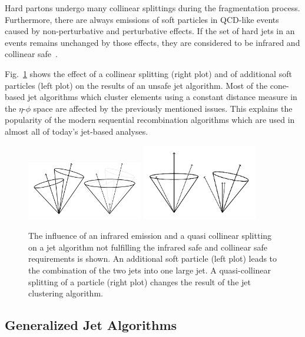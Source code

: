 Hard partons undergo many collinear splittings during the fragmentation process.
Furthermore, there are always emissions of soft particles in QCD-like events
caused by non-perturbative and perturbative effects. If the set of hard jets in an
events remains unchanged by those effects, they are considered to be infrared
and collinear safe~\cite{Salam:2009jx}.

Fig.~\ref{fig:infrared_safety} shows the effect of a collinear splitting (right
plot) and of additional soft particles (left plot) on the results of an unsafe
jet algorithm. Most of the cone-based jet algorithms which cluster elements
using a constant distance measure in the $\eta$-$\phi$ space are affected by the
previously mentioned issues. This explains the popularity of the modern sequential
recombination algorithms which are used in almost all of today's jet-based
analyses.

\begin{figure}[htbp]
    \centering
    \includegraphics[width=0.45\textwidth]{figures/drawings/infrared_safety/jetinfrared.pdf}\hfill
    \includegraphics[width=0.45\textwidth]{figures/drawings/infrared_safety/jetcollinear.pdf}
    \caption[Effect of infrared emissions and collinear splitting on jet
    algorithms]{The influence of an infrared emission and a quasi
        collinear splitting on a jet algorithm not fulfilling the infrared safe
        and collinear safe requirements is shown. An additional soft particle (left plot)
    leads to the combination of the two jets into one large jet. A
quasi-collinear splitting of a particle (right plot) changes the result of the
jet clustering algorithm.}
    \label{fig:infrared_safety}
\end{figure}

\subsection{Generalized \kt Jet Algorithms}

